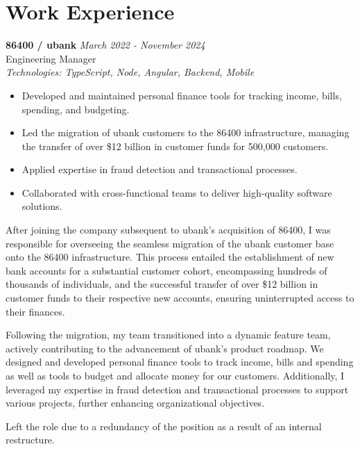 \documentclass[a4paper,10pt]{article}
\begin{document}
\section*{Work Experience}

\textbf{86400 / ubank} \hfill \textit{March 2022 - November 2024} \\
Engineering Manager \\
\textit{Technologies: TypeScript, Node, Angular, Backend, Mobile}
\begin{itemize}
    \item Developed and maintained personal finance tools for tracking income, bills, spending, and budgeting.
    \item Led the migration of ubank customers to the 86400 infrastructure, managing the transfer of over \$12 billion in customer funds for 500,000 customers.
    \item Applied expertise in fraud detection and transactional processes.
    \item Collaborated with cross-functional teams to deliver high-quality software solutions.
\end{itemize}

After joining the company subsequent to ubank's acquisition of 86400, I was responsible for overseeing the seamless migration of the ubank customer base onto the 86400 infrastructure. This process entailed the establishment of new bank accounts for a substantial customer cohort, encompassing hundreds of thousands of individuals, and the successful transfer of over \$12 billion in customer funds to their respective new accounts, ensuring uninterrupted access to their finances.

Following the migration, my team transitioned into a dynamic feature team, actively contributing to the advancement of ubank's product roadmap. We designed and developed personal finance tools to track income, bills and spending as well as tools to budget and allocate money for our customers. Additionally, I leveraged my expertise in fraud detection and transactional processes to support various projects, further enhancing organizational objectives.

Left the role due to a redundancy of the position as a result of an internal restructure.

\vspace{1em}
\end{document}
